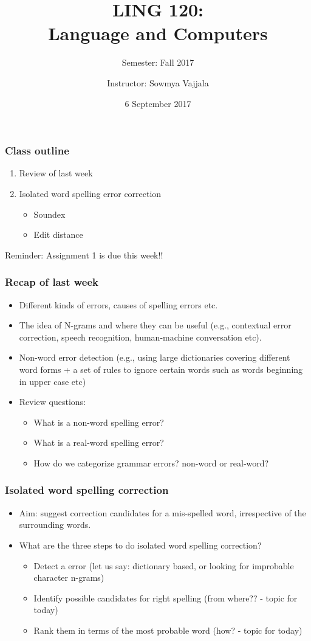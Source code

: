 \documentclass{beamer}
\author[Sowmya Vajjala]{Instructor: Sowmya Vajjala}
\title[LING 120]{LING 120: \\ Language and Computers}
\subtitle{Semester: Fall 2017}
\date{6 September 2017}
\institute{Iowa State University, USA}
\begin{document}
\begin{frame}\titlepage
\end{frame}

\begin{frame}
\frametitle{Class outline}
\begin{enumerate}
\item Review of last week
\item Isolated word spelling error correction
\begin{itemize}
\item Soundex
\item Edit distance
\end{itemize}
\end{enumerate}
Reminder: Assignment 1 is due this week!!
\end{frame}

\begin{frame}
\frametitle{Recap of last week}
\begin{itemize}
\item Different kinds of errors, causes of spelling errors etc.
\item The idea of N-grams and where they can be useful (e.g., contextual error correction, speech recognition, human-machine conversation etc). 
\item Non-word error detection (e.g., using large dictionaries covering different word forms + a set of rules to ignore certain words such as words beginning in upper case etc)  \pause
\item Review questions:
\begin{itemize}
\item What is a non-word spelling error? \pause
\item What is a real-word spelling error? \pause 
\item How do we categorize grammar errors? non-word or real-word?
\end{itemize}
\end{itemize}
\end{frame}

\begin{frame}
\frametitle{Isolated word spelling correction}
\begin{itemize}
\item Aim: suggest correction candidates for a mis-spelled word, irrespective of the surrounding words.
\item What are the three steps to do isolated word spelling correction? \pause
\begin{itemize}
\item Detect a error (let us say: dictionary based, or looking for improbable character n-grams)
\item Identify possible candidates for right spelling (from where?? - topic for today)
\item Rank them in terms of the most probable word (how? - topic for today)
\end{itemize}
\end{itemize}
\end{frame}
\end{document}
